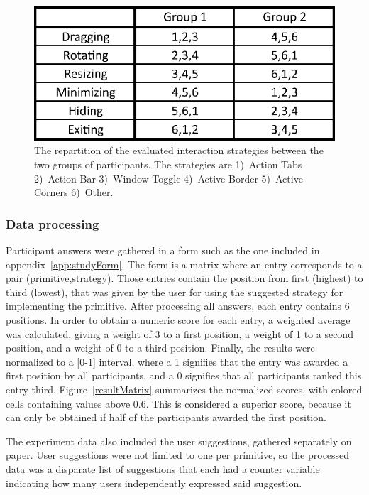 \begin{figure}[htb]
  \centering
    \includegraphics[scale=1]{images/groups}
  \caption{The repartition of the evaluated interaction strategies between the two groups of participants. The strategies are 1)~Action Tabs 2)~Action Bar 3)~Window Toggle 4)~Active Border 5)~Active Corners 6)~Other.}
  \label{groups}
\end{figure}


\subsubsection{Data processing}

Participant answers were gathered in a form such as the one included in appendix~\ref{app:studyForm}.
The form is a matrix where an entry corresponds to a pair (primitive,strategy).
Those entries contain the position from first (highest) to third (lowest), that was given by the user for using the suggested strategy for implementing the primitive.
After processing all answers, each entry contains 6 positions.
In order to obtain a numeric score for each entry, a weighted average was calculated, giving a weight of 3 to a first position, a weight of 1 to a second position, and a weight of 0 to a third position.
Finally, the results were normalized to a [0-1] interval, where a 1 signifies that the entry was awarded a first position by all participants, and a 0 signifies that all participants ranked this entry third.
Figure~\ref{resultMatrix} summarizes the normalized scores, with colored cells containing values above 0.6.
This is considered a superior score, because it can only be obtained if half of the participants awarded the first position.

The experiment data also included the user suggestions, gathered separately on paper.
User suggestions were not limited to one per primitive, so the processed data was a disparate list of suggestions that each had a counter variable indicating how many users independently expressed said suggestion.


